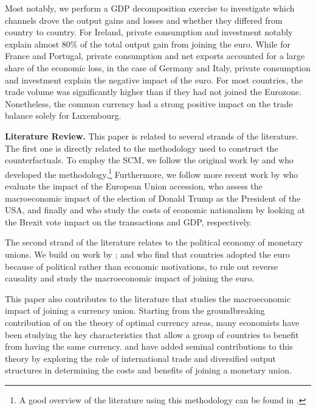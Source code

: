 \documentclass[12pt]{article}
\begin{document}
Most notably, we perform a GDP decomposition exercise to investigate which channels drove the output gains and losses and whether they differed from country to country. For Ireland, private consumption and investment notably explain almost 80\% of the total output gain from joining the euro. While for France and Portugal, private consumption and net exports accounted for a large share of the economic loss, in the case of Germany and Italy, private consumption and investment explain the negative impact of the euro. For most countries, the trade volume was significantly higher than if they had not joined the Eurozone. Nonetheless, the common currency had a strong positive impact on the trade balance solely for Luxembourg.

\textbf{Literature Review.} This paper is related to several strands of the literature. The first one is directly related to the methodology used to construct the counterfactuals. To employ the SCM, we follow the original work by \cite{Abadie2003} and  \cite{Abadie2010, Abadie2015} who developed the methodology.\footnote{A good overview of the literature using this methodology can be found in \cite{Abadie2019}.} Furthermore, we follow more recent work by \cite{Campos2018} who evaluate the impact of the European Union accession, \cite{Born2019} who assess the macroeconomic impact of the election of Donald Trump as the President of the USA, and finally \cite{Breinlich2020} and \cite{Born2018} who study the costs of economic nationalism by looking at the Brexit vote impact on the transactions and GDP, respectively.

The second strand of the literature relates to the political economy of monetary unions. We build on work by \cite{Eichengreen1993,  Feldstein1997, Dyson1999, Willett2000, James2012}; and  \cite{Spolaore2013} who find that countries adopted the euro because of political rather than economic motivations, to rule out reverse causality and study the macroeconomic impact of joining the euro.

This paper also contributes to the literature that studies the macroeconomic impact of joining a currency union. Starting from the groundbreaking contribution of \cite{Mundell1961} on the theory of optimal currency areas, many economists have been studying the key characteristics that allow a group of countries to benefit from having the same currency. \cite{McKinnon1963} and \cite{Kenen1969} have added seminal contributions to this theory by exploring the role of international trade and diversified output structures in determining the costs and benefits of joining a monetary union.
\end{document}
